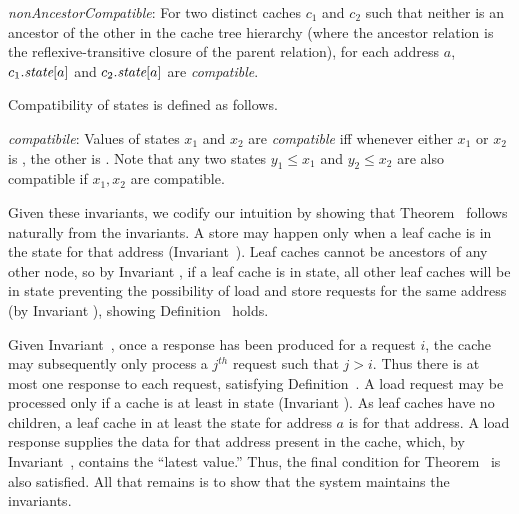 \begin{inv}
\textit{nonAncestorCompatible}: For two distinct caches $c_1$ and $c_2$ such
that neither is an ancestor of the other in the cache tree
hierarchy (where the ancestor relation is the reflexive-transitive closure of the parent relation), for each
address $a$, $c_1.\textit{state}[a]$ and $c_2.\textit{state}[a]$ are \textit{compatible}.
\label{nonAncestorCompatible}
\end{inv}
Compatibility of states is defined as follows.
\begin{defn}
\textit{compatibile}: Values of states $x_1$ and $x_2$ are \textit{compatible} iff
whenever either $x_1$ or $x_2$ is \Mo{}, the other is \In. Note that any two states $y_1 \le x_1$ and $y_2 \le x_2$ are also compatible if $x_1, x_2$ are compatible.
\label{compatible}
\end{defn}

%


Given these invariants, we codify our intuition by showing that
Theorem~ follows naturally from the
invariants.  A store may happen only when a leaf cache is in the \Mo{} state
for that address (Invariant~). Leaf caches cannot
be ancestors of any other node, so by Invariant
, if a leaf cache is in \Mo{} state, all
other leaf caches will be in \In{} state preventing the possibility of
load and store requests for the same address (by Invariant
), showing Definition~ holds.

Given Invariant~, once a response has been produced
for a request $i$, the cache may subsequently only process a $j^{th}$
request such that $j > i$. Thus there is at most one response to each
request, satisfying Definition~. A load request
may be processed only if a cache is at least in \Sh{} state (Invariant
). As leaf caches have no children, a leaf cache in
at least the \Sh{} state for address $a$ is \clean{} for that address. A
load response supplies the data for that address present in the cache,
which, by Invariant~, contains the ``latest
value.'' Thus, the final condition for Theorem~
is also satisfied. All that remains is to show that the system maintains the
invariants.

